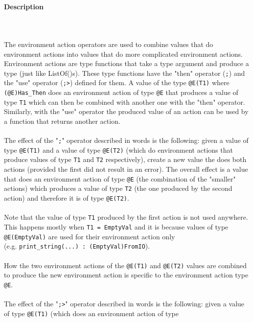 \documentclass{article}
\begin{document}
\paragraph{Description}\mbox{} \\\\
The environment action operators are used to combine values that do environment
actions into values that do more complicated environment actions. Environment
actions are type functions that take a type argument and produce a type (just
like ListOf()s). These type functions have the "then" operator (\texttt{;}) and
the "use" operator (\texttt{;>}) defined for them.  A value of the type
\texttt{@E(T1)} where \texttt{(@E)Has_Then} does an environment action of type
\texttt{@E} that produces a value of type \texttt{T1} which can then be combined
with another one with the "then" operator. Similarly, with the "use" operator
the produced value of an action can be used by a function that returns another
action.
\\\\
The effect of the "\texttt{;}" operator described in words is the following:
given a value of type \texttt{@E(T1)} and a value of type \texttt{@E(T2)} (which
do environment actions that produce values of type \texttt{T1} and \texttt{T2}
respectively), create a new value the does both actions (provided the first did
not result in an error).  The overall effect is a value that does an
environment action of type \texttt{@E} (the combination of the "smaller"
actions) which produces a value of type \texttt{T2} (the one produced by the second
action) and therefore it is of type \texttt{@E(T2)}.
\\\\
Note that the value of type \texttt{T1} produced by the first action is not used
anywhere. This happens mostly when \texttt{T1 = EmptyVal} and it is 
because values of type \texttt{@E(EmptyVal)} are used for their environment
action only \\(e.g. \texttt{print_string(...)\ :\ (EmptyVal)FromIO}).
\\\\
How the two environment actions of the \texttt{@E(T1)} and \texttt{@E(T2)} values
are combined to produce the new environment action is specific to the
environment action type \texttt{@E}.
\\\\
The effect of the "\texttt{;>}" operator described in words is the following:
given a value of type \texttt{@E(T1)} (which does an environment action of type
\end{document}
